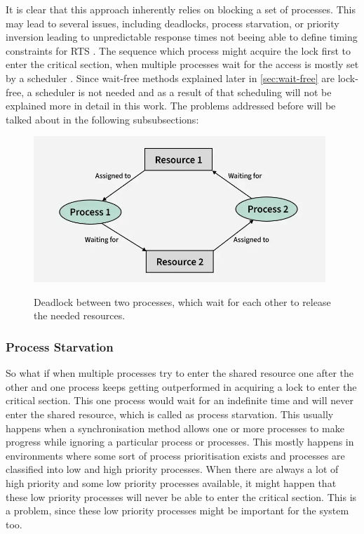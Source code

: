 It is clear that this approach inherently relies on blocking a set of processes. This may lead to several issues, including deadlocks, process starvation, or priority inversion leading to unpredictable response times not beeing able to define timing constraints for \ac{RTS} \cite{brandenburg2019multiprocessorrealtimelockingprotocols}. The sequence which process might acquire the lock first to enter the critical section, when multiple processes wait for the access is mostly set by a scheduler \cite{brandenburg2019multiprocessorrealtimelockingprotocols}. Since wait-free methods explained later in \cref{sec:wait-free} are lock-free, a scheduler is not needed and as a result of that scheduling will not be explained more in detail in this work. The problems addressed before will be talked about in the following subsubsections:

\begin{figure}[!ht]
    \centering
    \captionsetup{justification=centering}
    \caption{Deadlock between two processes, which wait for each other to release the needed resources.}
    \includegraphics[width=110mm]{images/deadlock.png}
    \cite{Deadlock}
    \label{fig:deadlock}
\end{figure}

\subsubsection{Process Starvation}\label{subsubsec:process-starvation}

So what if when multiple processes try to enter the shared resource one after the other and one process keeps getting outperformed in acquiring a lock to enter the critical section. This one  process would wait for an indefinite time and will never enter the shared resource, which is called as process starvation. This usually happens when a synchronisation method allows one or more processes to make progress while ignoring a particular process or processes. This mostly happens in environments where some sort of process prioritisation exists and processes are classified into low and high priority processes. When there are always a lot of high priority and some low priority processes available, it might happen that these low priority processes will never be able to enter the critical section. This is a problem, since these low priority processes might be important for the system too. \cite{Starvation}

